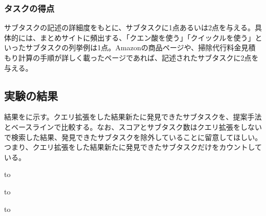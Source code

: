 \documentclass[submit,techreq]{ipsj}
\begin{document}
\subsubsection{タスクの得点}
サブタスクの記述の詳細度をもとに、サブタスクに1点あるいは2点を与える。具体的には、まとめサイトに頻出する、「クエン酸を使う」「クイックルを使う」といったサブタスクの列挙例は1点。Amazonの商品ページや、掃除代行料金見積もり計算の手順が詳しく載ったページであれば、記述されたサブタスクに2点を与える。


\subsection{実験の結果}
結果をに示す。クエリ拡張をした結果新たに発見できたサブタスクを、提案手法とベースラインで比較する。なお、スコアとサブタスク数はクエリ拡張をしないで検索した結果、発見できたサブタスクを除外していることに留意してほしい。つまり、クエリ拡張をした結果新たに発見できたサブタスクだけをカウントしている。


\begin{table}[tb] 
\caption{「部屋の掃除をする」でのサブタスク検索の結果} 
\label{tab:result}
\hbox to
\end{table}

\begin{table}[tb] 
\caption{「コーヒーを淹れる」でのサブタスク検索の結果} 
\label{tab:result2}
\hbox to
\end{table}


\begin{table}[tb] 
\caption{「ダイエットする」でのサブタスク検索の結果} 
\label{tab:result3}
\hbox to
\end{table}
\end{document}
